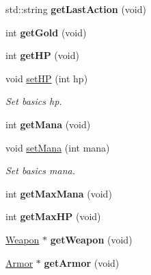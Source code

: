 \begin{DoxyCompactItemize}
\item 
\hypertarget{class_characters_a0df57bdee9ddc5e4e18954b8b30b1331}{std\+::string {\bfseries get\+Last\+Action} (void)}\label{class_characters_a0df57bdee9ddc5e4e18954b8b30b1331}

\item 
\hypertarget{class_characters_a76b0e62a2f7c10e71682196db0ee0056}{int {\bfseries get\+Gold} (void)}\label{class_characters_a76b0e62a2f7c10e71682196db0ee0056}

\item 
\hypertarget{class_characters_a136d6ba8b4bd401fda19b14b089a107f}{int {\bfseries get\+H\+P} (void)}\label{class_characters_a136d6ba8b4bd401fda19b14b089a107f}

\item 
void \hyperlink{class_characters_a472ee80119879c2238996b163ade6bd8}{set\+H\+P} (int hp)
\begin{DoxyCompactList}\small\item\em Set basics hp. \end{DoxyCompactList}\item 
\hypertarget{class_characters_a09d7d1435edcdd64b9672521ee2020eb}{int {\bfseries get\+Mana} (void)}\label{class_characters_a09d7d1435edcdd64b9672521ee2020eb}

\item 
void \hyperlink{class_characters_a86b87a489aa323c649e0da740d278034}{set\+Mana} (int mana)
\begin{DoxyCompactList}\small\item\em Set basics mana. \end{DoxyCompactList}\item 
\hypertarget{class_characters_a9a65b8e37eff687ebb74c442923e9f25}{int {\bfseries get\+Max\+Mana} (void)}\label{class_characters_a9a65b8e37eff687ebb74c442923e9f25}

\item 
\hypertarget{class_characters_a00a48dd783fee5cb7b57ac41219632ff}{int {\bfseries get\+Max\+H\+P} (void)}\label{class_characters_a00a48dd783fee5cb7b57ac41219632ff}

\item 
\hypertarget{class_characters_aae885a7d773657cdf18f8dfced51d1a8}{\hyperlink{class_weapon}{Weapon} $\ast$ {\bfseries get\+Weapon} (void)}\label{class_characters_aae885a7d773657cdf18f8dfced51d1a8}

\item 
\hypertarget{class_characters_a820210f40b0c3c73cffe0f89caebbb6f}{\hyperlink{class_armor}{Armor} $\ast$ {\bfseries get\+Armor} (void)}\label{class_characters_a820210f40b0c3c73cffe0f89caebbb6f}


\end{DoxyCompactItemize}
